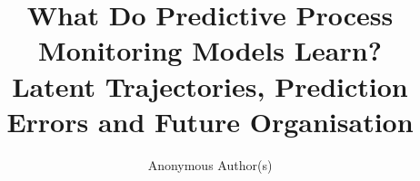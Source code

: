 \documentclass[runningheads]{llncs}
\begin{document}
\title{What Do Predictive Process Monitoring Models Learn?\\
\large Latent Trajectories, Prediction Errors and Future Organisation}

\author{Anonymous Author(s)}

\maketitle













\end{document}
